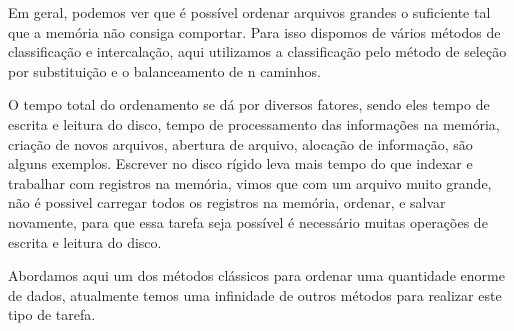 Em geral, podemos ver que é possível ordenar arquivos grandes o suficiente tal que a memória não consiga comportar. Para isso dispomos de vários métodos de classificação e intercalação, aqui utilizamos a classificação pelo método de seleção por substituição e o balanceamento de n caminhos.
\par
O tempo total do ordenamento se dá por diversos fatores, sendo eles tempo de escrita e leitura do disco, tempo de processamento das informações na memória, criação de novos arquivos, abertura de arquivo, alocação de informação, são alguns exemplos. Escrever no disco rígido leva mais tempo do que indexar e trabalhar com registros na memória, vimos que com um arquivo muito grande, não é possivel carregar todos os registros na memória, ordenar, e salvar novamente, para que essa tarefa seja possível é necessário muitas operações de escrita e leitura do disco.
\par
Abordamos aqui um dos métodos clássicos para ordenar uma quantidade enorme de dados, atualmente temos uma infinidade de outros métodos para realizar este tipo de tarefa. 

